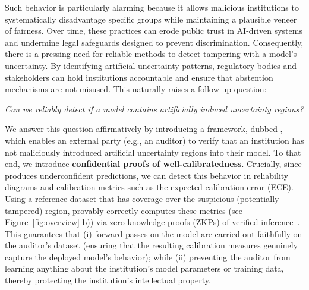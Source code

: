 Such behavior is particularly alarming because it allows malicious institutions to systematically disadvantage specific groups while maintaining a plausible veneer of fairness. Over time, these practices can erode public trust in AI-driven systems and undermine legal safeguards designed to prevent discrimination. Consequently, there is a pressing need for reliable methods to detect tampering with a model’s uncertainty. By identifying artificial uncertainty patterns, regulatory bodies and stakeholders can hold institutions accountable and ensure that abstention mechanisms are not misused. This naturally raises a follow-up question:
\begin{center}
\textit{Can we reliably detect if a model contains artificially induced uncertainty regions?} %
\end{center}%



We answer this question affirmatively by introducing a framework, dubbed \name, which enables an external party (e.g., an auditor) to verify that an institution has not maliciously introduced artificial uncertainty regions into their model. To that end, we introduce \textbf{confidential proofs of well-calibratedness}.  %
Crucially, since \attack produces underconfident predictions, we can detect this behavior in reliability diagrams and calibration metrics such as the expected calibration error (ECE). Using a reference dataset that has coverage over the suspicious (potentially tampered) region, \name provably correctly computes these metrics (see Figure~\ref{fig:overview} b)) via zero-knowledge proofs (ZKPs) of verified inference~\citep{weng2021mystique, sun2024zkllm}. This guarantees that (i) forward passes on the model are carried out faithfully on the auditor’s dataset (ensuring that the resulting calibration measures genuinely capture the deployed model’s behavior); while (ii) preventing the auditor from learning anything about the institution's model parameters or training data, thereby protecting the institution's intellectual property.

